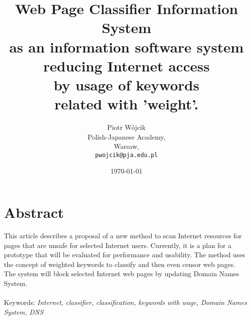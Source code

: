 \documentclass[9pt,a4paper]{extarticle}
\title{Web Page Classifier Information System\\ as an information software system\\ reducing Internet access\\ by usage of keywords\\ related with 'weight'.}
\author{Piotr W\'{o}jcik\\
    Polish-Japanese Academy,\\
    Warsaw,\\
    \texttt{pwojcik@pja.edu.pl}
}
\date{\today}
\begin{document}
\maketitle


\section{Abstract}
This article describes a proposal of a new method to scan Internet resources for pages that are unsafe for selected Internet users. 
Currently, it is a plan for a prototype that will be evaluated for performance and usability. 
The method uses the concept of weighted keywords to classify and then even censor web pages.
The system will block selected Internet web pages by updating Domain Names System.\\
\\
Keywords: \textit{Internet, classifier, classification, keywords with wage, Domain Names System, DNS}
\end{document}
